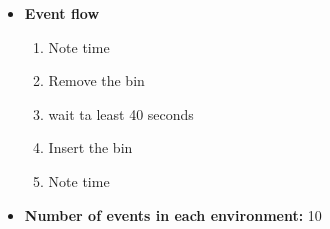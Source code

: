 \begin{itemize}
    \item \textbf{Event flow} \begin{enumerate}
                                    \item Note time
                                    \item Remove the bin
                                    \item wait ta least 40 seconds
                                    \item Insert the bin
                                    \item Note time
                                \end{enumerate}
    \item \textbf{Number of events in each environment:} 10
\end{itemize}



